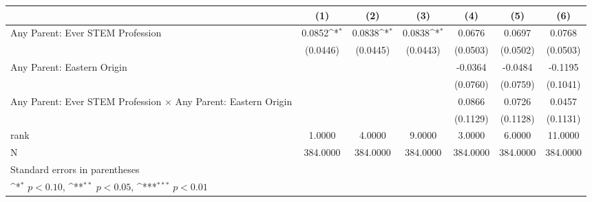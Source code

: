 {
\def\sym#1{\ifmmode^{#1}\else\(^{#1}\)\fi}
\begin{tabular}{l*{6}{c}}
\toprule
                    &\multicolumn{1}{c}{(1)}         &\multicolumn{1}{c}{(2)}         &\multicolumn{1}{c}{(3)}         &\multicolumn{1}{c}{(4)}         &\multicolumn{1}{c}{(5)}         &\multicolumn{1}{c}{(6)}         \\
\midrule
Any Parent: Ever STEM Profession&      0.0852\sym{*}  &      0.0838\sym{*}  &      0.0838\sym{*}  &      0.0676         &      0.0697         &      0.0768         \\
                    &    (0.0446)         &    (0.0445)         &    (0.0443)         &    (0.0503)         &    (0.0502)         &    (0.0503)         \\
\addlinespace
Any Parent: Eastern Origin&                     &                     &                     &     -0.0364         &     -0.0484         &     -0.1195         \\
                    &                     &                     &                     &    (0.0760)         &    (0.0759)         &    (0.1041)         \\
\addlinespace
Any Parent: Ever STEM Profession $\times$ Any Parent: Eastern Origin&                     &                     &                     &      0.0866         &      0.0726         &      0.0457         \\
                    &                     &                     &                     &    (0.1129)         &    (0.1128)         &    (0.1131)         \\
\midrule
rank                &      1.0000         &      4.0000         &      9.0000         &      3.0000         &      6.0000         &     11.0000         \\
N                   &    384.0000         &    384.0000         &    384.0000         &    384.0000         &    384.0000         &    384.0000         \\
\bottomrule
\multicolumn{7}{l}{\footnotesize Standard errors in parentheses}\\
\multicolumn{7}{l}{\footnotesize \sym{*} \(p<0.10\), \sym{**} \(p<0.05\), \sym{***} \(p<0.01\)}\\
\end{tabular}
}
